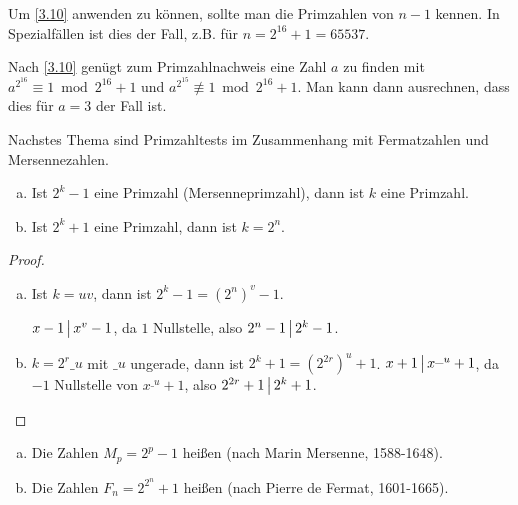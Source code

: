 \begin{nt} \label{3.11}
	Um \ref{3.10} anwenden zu können, sollte man die Primzahlen von $n-1$ kennen.
	In Spezialfällen ist dies der Fall, z.B. für $n = 2^{16} + 1 = 65537$.

	Nach \ref{3.10} genügt zum Primzahlnachweis eine Zahl $a$ zu finden mit $a^{2^{16}} \equiv 1 \bmod 2^{16} + 1$ und $a^{2^{15}} \not\equiv 1 \bmod 2^{16} + 1$.
	Man kann dann ausrechnen, dass dies für $a = 3$ der Fall ist.
\end{nt}

Nachstes Thema sind Primzahltests im Zusammenhang mit Fermatzahlen und Mersennezahlen.

\begin{lem} \label{3.12}
	\begin{enumerate}[a)]
		\item
			Ist $2^k - 1$ eine Primzahl (Mersenneprimzahl), dann ist $k$ eine Primzahl.
		\item
			Ist $2^k + 1$ eine Primzahl, dann ist $k = 2^n$.
	\end{enumerate}
	\begin{proof}
		\begin{enumerate}[a)]
			\item
				Ist $k = uv$, dann ist $2^k - 1 = (2^n)^v - 1$.

				$x-1 \divs x^v - 1$, da $1$ Nullstelle, also $2^n -1 \divs 2^k - 1$.
			\item
				$k = 2^r \_ u$ mit $\_ u$ ungerade, dann ist $2^k + 1 = (2^{2r})^u + 1$.
				$x + 1 \divs x^{\_ u} + 1$, da $-1$ Nullstelle von $x^{\_ u} + 1$, also $2^{2r} + 1 \divs 2^k + 1$.
		\end{enumerate}
	\end{proof}
\end{lem}

\begin{df} \label{3.13}
	\begin{enumerate}[a)]
		\item
			Die Zahlen $M_p = 2^p - 1$ heißen  (nach Marin Mersenne, 1588-1648).
		\item
			Die Zahlen $F_n = 2^{2^n} + 1$ heißen  (nach Pierre de Fermat, 1601-1665).
	\end{enumerate}
\end{df}

